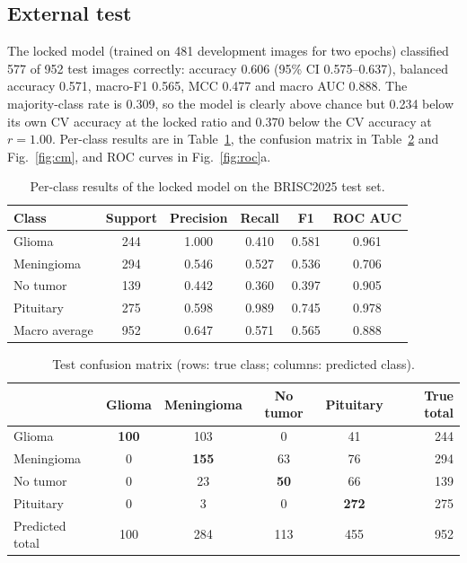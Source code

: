 \documentclass[10pt,a4paper]{article}
\begin{document}
\subsection{External test}
The locked model (trained on 481 development images for two epochs) classified 577 of 952 test images correctly: accuracy 0.606 (95\% CI 0.575--0.637), balanced accuracy 0.571, macro-F1 0.565, MCC 0.477 and macro AUC 0.888. The majority-class rate is 0.309, so the model is clearly above chance but 0.234 below its own CV accuracy at the locked ratio and 0.370 below the CV accuracy at $r=1.00$. Per-class results are in Table~\ref{tab:cls}, the confusion matrix in Table~\ref{tab:cm} and Fig.~\ref{fig:cm}, and ROC curves in Fig.~\ref{fig:roc}a.

\begin{table}[H]\centering\small
\caption{Per-class results of the locked model on the BRISC2025 test set.}\label{tab:cls}
\begin{tabular}{lccccc}
\toprule
Class & Support & Precision & Recall & F1 & ROC AUC \\
\midrule
Glioma & 244 & 1.000 & 0.410 & 0.581 & 0.961 \\
Meningioma & 294 & 0.546 & 0.527 & 0.536 & 0.706 \\
No tumor & 139 & 0.442 & 0.360 & 0.397 & 0.905 \\
Pituitary & 275 & 0.598 & 0.989 & 0.745 & 0.978 \\
\midrule
Macro average & 952 & 0.647 & 0.571 & 0.565 & 0.888 \\
\bottomrule
\end{tabular}
\end{table}

\begin{table}[H]\centering\small
\caption{Test confusion matrix (rows: true class; columns: predicted class).}\label{tab:cm}
\begin{tabular}{lccccr}
\toprule
 & Glioma & Meningioma & No tumor & Pituitary & True total \\
\midrule
Glioma & \textbf{100} & 103 & 0 & 41 & 244 \\
Meningioma & 0 & \textbf{155} & 63 & 76 & 294 \\
No tumor & 0 & 23 & \textbf{50} & 66 & 139 \\
Pituitary & 0 & 3 & 0 & \textbf{272} & 275 \\
\midrule
Predicted total & 100 & 284 & 113 & 455 & 952 \\
\bottomrule
\end{tabular}
\end{table}
\end{document}
